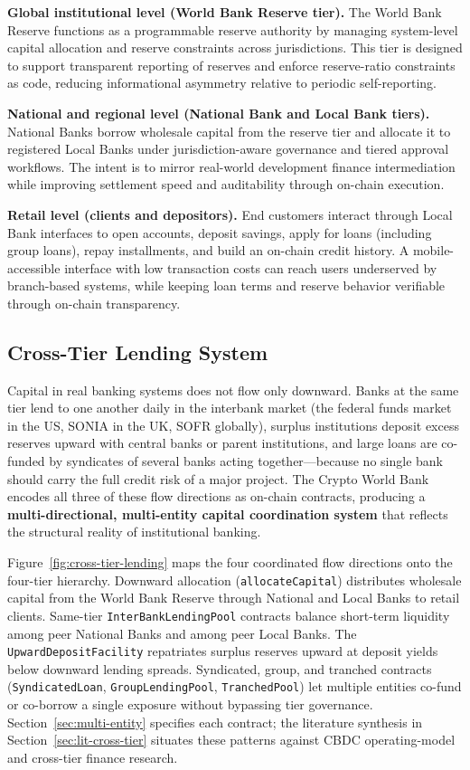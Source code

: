 \documentclass[12pt,a4paper]{report}
\begin{document}
\textbf{Global institutional level (World Bank Reserve tier).} The World Bank Reserve functions as a programmable reserve authority by managing system-level capital allocation and reserve constraints across jurisdictions. This tier is designed to support transparent reporting of reserves and enforce reserve-ratio constraints as code, reducing informational asymmetry relative to periodic self-reporting.

\textbf{National and regional level (National Bank and Local Bank tiers).} National Banks borrow wholesale capital from the reserve tier and allocate it to registered Local Banks under jurisdiction-aware governance and tiered approval workflows. The intent is to mirror real-world development finance intermediation while improving settlement speed and auditability through on-chain execution.

\textbf{Retail level (clients and depositors).} End customers interact through Local Bank interfaces to open accounts, deposit savings, apply for loans (including group loans), repay installments, and build an on-chain credit history. A mobile-accessible interface with low transaction costs can reach users underserved by branch-based systems, while keeping loan terms and reserve behavior verifiable through on-chain transparency.

\subsection{Cross-Tier Lending System}
\label{sec:cross-tier-lending}

Capital in real banking systems does not flow only downward. Banks at the same tier lend to one another daily in the interbank market (the federal funds market in the US, SONIA in the UK, SOFR globally), surplus institutions deposit excess reserves upward with central banks or parent institutions, and large loans are co-funded by syndicates of several banks acting together---because no single bank should carry the full credit risk of a major project. The Crypto World Bank encodes all three of these flow directions as on-chain contracts, producing a \textbf{multi-directional, multi-entity capital coordination system} that reflects the structural reality of institutional banking.

Figure~\ref{fig:cross-tier-lending} maps the four coordinated flow directions onto the four-tier hierarchy. Downward allocation (\texttt{allocateCapital}) distributes wholesale capital from the World Bank Reserve through National and Local Banks to retail clients. Same-tier \texttt{InterBankLendingPool} contracts balance short-term liquidity among peer National Banks and among peer Local Banks. The \texttt{UpwardDepositFacility} repatriates surplus reserves upward at deposit yields below downward lending spreads. Syndicated, group, and tranched contracts (\texttt{SyndicatedLoan}, \texttt{GroupLendingPool}, \texttt{TranchedPool}) let multiple entities co-fund or co-borrow a single exposure without bypassing tier governance. Section~\ref{sec:multi-entity} specifies each contract; the literature synthesis in Section~\ref{sec:lit-cross-tier} situates these patterns against CBDC operating-model and cross-tier finance research.
\end{document}
